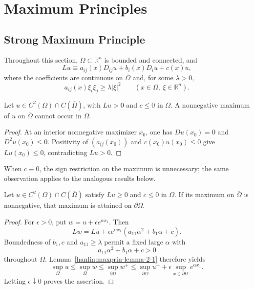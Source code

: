 \chapter{Maximum Principles}

\section{Strong Maximum Principle}\label{hanlin:maxprin-section-2-1}

Throughout this section, $\Omega\subset\mathbb{R}^n$ is bounded and connected, and
\[
Lu \equiv a_{ij}(x)D_{ij}u + b_i(x)D_iu + c(x)u,
\]
where the coefficients are continuous on $\overline\Omega$ and, for some
$\lambda>0$,
\[
a_{ij}(x)\xi_i\xi_j \ge \lambda |\xi|^2
\qquad (x\in\Omega,\ \xi\in\mathbb{R}^n).
\]

\begin{lemma}\label{hanlin:maxprin-lemma-2-1}


Let $u\in C^2(\Omega)\cap C(\overline\Omega)$, with $Lu>0$ and $c\le0$ in
$\Omega$. A nonnegative maximum of $u$ on $\overline\Omega$ cannot occur in
$\Omega$.
\end{lemma}
\begin{proof}
\sketch At an interior nonnegative maximizer $x_0$, one has $Du(x_0)=0$ and
$D^2u(x_0)\le0$. Positivity of $(a_{ij}(x_0))$ and $c(x_0)u(x_0)\le0$ give
$Lu(x_0)\le0$, contradicting $Lu>0$.
\end{proof}

\begin{remark}\label{hanlin:maxprin-remark-2-2}


When $c\equiv0$, the sign restriction on the maximum is unnecessary; the same
observation applies to the analogous results below.
\end{remark}

\begin{lemma}\label{hanlin:maxprin-lemma-2-3}


Let $u\in C^2(\Omega)\cap C(\overline\Omega)$ satisfy $Lu\ge0$ and $c\le0$ in
$\Omega$. If its maximum on $\overline\Omega$ is nonnegative, that maximum is
attained on $\partial\Omega$.
\end{lemma}
\begin{proof}
\sketch For $\epsilon>0$, put $w=u+\epsilon e^{\alpha x_1}$. Then
\[
Lw = Lu + \epsilon e^{\alpha x_1}(a_{11}\alpha^2 + b_1\alpha + c).
\]
Boundedness of $b_1,c$ and $a_{11}\ge\lambda$ permit a fixed large $\alpha$ with
\[
a_{11}\alpha^2+b_1\alpha+c>0
\]
throughout $\Omega$. Lemma~\ref{hanlin:maxprin-lemma-2-1} therefore yields
\[
\sup_{\Omega} u \le \sup_{\Omega} w \le \sup_{\partial \Omega} w^+
\le \sup_{\partial \Omega} u^+ + \epsilon \sup_{x \in \partial \Omega} e^{\alpha x_1}.
\]
Letting $\epsilon\downarrow0$ proves the assertion.
\end{proof}

